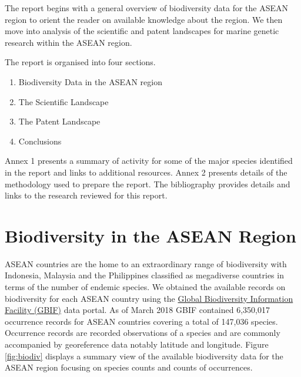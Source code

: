 \documentclass[]{book}
\providecommand{\tightlist}{%
  \setlength{\itemsep}{0pt}\setlength{\parskip}{0pt}}
\theoremstyle{definition}
\theoremstyle{definition}
\theoremstyle{definition}
\theoremstyle{remark}
\begin{document}
The report begins with a general overview of biodiversity data for the
ASEAN region to orient the reader on available knowledge about the
region. We then move into analysis of the scientific and patent
landscapes for marine genetic research within the ASEAN region.

The report is organised into four sections.

\begin{enumerate}
\def\labelenumi{\arabic{enumi}.}
\tightlist
\item
  Biodiversity Data in the ASEAN region
\item
  The Scientific Landscape
\item
  The Patent Landscape
\item
  Conclusions
\end{enumerate}

Annex 1 presents a summary of activity for some of the major species
identified in the report and links to additional resources. Annex 2
presents details of the methodology used to prepare the report. The
bibliography provides details and links to the research reviewed for
this report.

\hypertarget{biodiversity}{%
\chapter{Biodiversity in the ASEAN Region}\label{biodiversity}}

ASEAN countries are the home to an extraordinary range of biodiversity
with Indonesia, Malaysia and the Philippines classified as megadiverse
countries in terms of the number of endemic species. We obtained the
available records on biodiversity for each ASEAN country using the
\href{https://www.gbif.org/}{Global Biodiversity Information Facility
(GBIF)} data portal. As of March 2018 GBIF contained 6,350,017
occurrence records for ASEAN countries covering a total of 147,036
species. Occurrence records are recorded observations of a species and
are commonly accompanied by georeference data notably latitude and
longitude. Figure \ref{fig:biodiv} displays a summary view of the
available biodiversity data for the ASEAN region focusing on species
counts and counts of occurrences.
\end{document}
